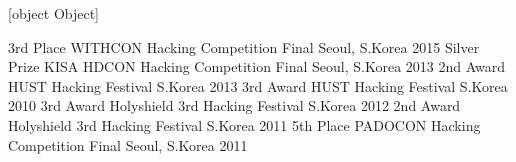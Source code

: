 
\begin{cvhonors}
  
  \cvhonor
    {}
    {}
    {}
    {[object Object]}
  
\end{cvhonors}

\begin{cvhonors}
  \cvhonor
    {3rd Place}
    {WITHCON Hacking Competition Final}
    {Seoul, S.Korea}
    {2015}
  \cvhonor
    {Silver Prize}
    {KISA HDCON Hacking Competition Final}
    {Seoul, S.Korea}
    {2013}
  \cvhonor
    {2nd Award}
    {HUST Hacking Festival}
    {S.Korea}
    {2013}
  \cvhonor
    {3rd Award}
    {HUST Hacking Festival}
    {S.Korea}
    {2010}
  \cvhonor
    {3rd Award}
    {Holyshield 3rd Hacking Festival}
    {S.Korea}
    {2012}
  \cvhonor
    {2nd Award}
    {Holyshield 3rd Hacking Festival}
    {S.Korea}
    {2011}
  \cvhonor
    {5th Place}
    {PADOCON Hacking Competition Final}
    {Seoul, S.Korea}
    {2011}
\end{cvhonors}

